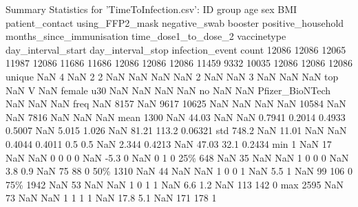 \documentclass[11pt]{article}
\begin{document}
\begin{codeoutput}
Summary Statistics for 'TimeToInfection.csv':
          ID  group   age     sex    BMI  patient\_contact  using\_FFP2\_mask  negative\_swab  booster positive\_household  months\_since\_immunisation  time\_dose1\_to\_dose\_2      vaccinetype  day\_interval\_start  day\_interval\_stop  infection\_event
count  12086  12086 12065   11987  12086            11686            11686          12086    12086              12086                      11459                  9332            10035               12086              12086            12086
unique   NaN      4   NaN       2      2              NaN              NaN            NaN      NaN                  2                        NaN                   NaN                3                 NaN                NaN              NaN
top      NaN      V   NaN  female    u30              NaN              NaN            NaN      NaN                 no                        NaN                   NaN  Pfizer\_BioNTech                 NaN                NaN              NaN
freq     NaN   8157   NaN    9617  10625              NaN              NaN            NaN      NaN              10584                        NaN                   NaN             7816                 NaN                NaN              NaN
mean    1300    NaN 44.03     NaN    NaN           0.7941           0.2014         0.4933   0.5007                NaN                      5.015                 1.026              NaN               81.21              113.2          0.06321
std    748.2    NaN 11.01     NaN    NaN           0.4044           0.4011            0.5      0.5                NaN                      2.344                0.4213              NaN               47.03               32.1           0.2434
min        1    NaN    17     NaN    NaN                0                0              0        0                NaN                       -5.3                     0              NaN                   0                  1                0
25\%      648    NaN    35     NaN    NaN                1                0              0        0                NaN                        3.8                   0.9              NaN                  75                 88                0
50\%     1310    NaN    44     NaN    NaN                1                0              0        1                NaN                        5.5                     1              NaN                  99                106                0
75\%     1942    NaN    53     NaN    NaN                1                0              1        1                NaN                        6.6                   1.2              NaN                 113                142                0
max     2595    NaN    73     NaN    NaN                1                1              1        1                NaN                       17.8                   5.1              NaN                 171                178                1


\end{codeoutput}
\end{document}
